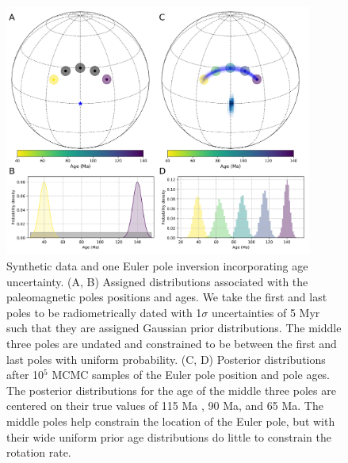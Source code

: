 \documentclass[11pt,letterpaper]{article}
\begin{document}
\begin{figure}
\centering
\includegraphics[width=0.9\textwidth]{fig_inversion_with_age_uncertainties.png}
\caption{Synthetic data and one Euler pole inversion incorporating age uncertainty. (A, B) Assigned distributions associated with the paleomagnetic poles positions and ages. We take the first and last poles to be radiometrically dated with 1$\sigma$ uncertainties of 5 Myr such that they are assigned Gaussian prior distributions. The middle three poles are undated and constrained to be between the first and last poles with uniform probability. (C, D) Posterior distributions after 10$^5$ MCMC samples of the Euler pole position and pole ages. The posterior distributions for the age of the middle three poles are centered on their true values of 115 Ma , 90 Ma, and 65 Ma. The middle poles help constrain the location of the Euler pole, but with their wide uniform prior age distributions do little to constrain the rotation rate.}
\label{fig:age_uncertainty_samples}
\end{figure}
\end{document}
